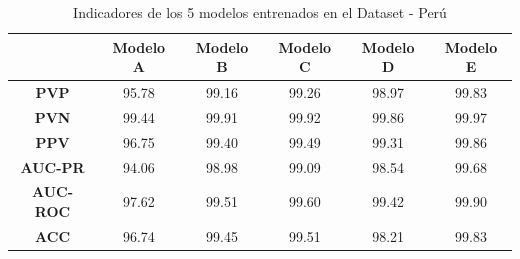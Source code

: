 		\begin{table}[H]
			\begin{center}
			\caption{\small{Indicadores de los 5 modelos entrenados en el Dataset - Perú}}
			\vspace{1.1em}
			\begin{tabular}{c|c|c|c|c|c|}
			\cline{2-6}
			                                 & \textbf{Modelo A} & \textbf{Modelo B} & \textbf{Modelo C} &\textbf{ Modelo D} & \textbf{Modelo E} \\ \hline
			\multicolumn{1}{|c|}{\textbf{PVP}}        & 95.78     & 99.16       & 99.26       & 98.97       & 99.83       \\ \hline
			\multicolumn{1}{|c|}{\textbf{PVN}}        & 99.44     & 99.91       & 99.92       & 99.86       & 99.97       \\ \hline
			\multicolumn{1}{|c|}{\textbf{PPV}}        & 96.75     & 99.40       & 99.49       & 99.31       & 99.86       \\ \hline
			\multicolumn{1}{|c|}{\textbf{AUC-PR}}     & 94.06     & 98.98       & 99.09       & 98.54       & 99.68       \\ \hline
			\multicolumn{1}{|c|}{\textbf{AUC-ROC}}    & 97.62     & 99.51       & 99.60       & 99.42       & 99.90       \\ \hline
			\multicolumn{1}{|c|}{\textbf{ACC}}        & 96.74     & 99.45       & 99.51       & 98.21       & 99.83       \\ \hline
			\end{tabular}
			\end{center}
		\end{table}
